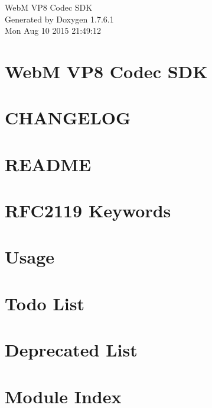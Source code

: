\documentclass[letterpaper]{article}
\begin{document}
\hypersetup{pageanchor=false,citecolor=blue}
\begin{titlepage}
\vspace*{7cm}
\begin{center}
{\Large \-Web\-M \-V\-P8 \-Codec \-S\-D\-K }\\
\vspace*{1cm}
{\large \-Generated by Doxygen 1.7.6.1}\\
\vspace*{0.5cm}
{\small Mon Aug 10 2015 21:49:12}\\
\end{center}
\end{titlepage}
\tableofcontents
{}
\hypersetup{pageanchor=true,citecolor=blue}
\section{\-Web\-M \-V\-P8 \-Codec \-S\-D\-K}
\label{index}\hypertarget{index}{}
\section{\-C\-H\-A\-N\-G\-E\-L\-O\-G}
\label{changelog}
\hypertarget{changelog}{}

\section{\-R\-E\-A\-D\-M\-E}
\label{readme}
\hypertarget{readme}{}

\section{\-R\-F\-C2119 \-Keywords}
\label{rfc2119}
\hypertarget{rfc2119}{}

\section{\-Usage}
\label{usage}
\hypertarget{usage}{}

\section{\-Todo \-List}
\label{todo}
\hypertarget{todo}{}

\section{\-Deprecated \-List}
\label{deprecated}
\hypertarget{deprecated}{}

\section{\-Module \-Index}

\end{document}
